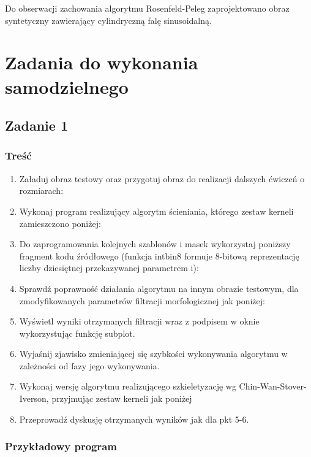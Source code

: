 Do obserwacji zachowania algorytmu Rosenfeld-Peleg zaprojektowano obraz syntetyczny zawierający cylindryczną falę sinusoidalną.

\section{Zadania do wykonania samodzielnego}

\subsection{Zadanie 1}

\subsubsection{Treść}

\begin{enumerate}
	\item Załaduj obraz testowy oraz przygotuj obraz do realizacji dalszych ćwiczeń o rozmiarach:
	\item Wykonaj program realizujący algorytm ścieniania, którego zestaw kerneli zamieszczono poniżej:
	\item Do zaprogramowania kolejnych szablonów i masek wykorzystaj poniższy fragment kodu źródłowego (funkcja intbin8 formuje 8-bitową reprezentację liczby dziesiętnej przekazywanej parametrem i):
	\item Sprawdź poprawność działania algorytmu na innym obrazie testowym, dla zmodyfikowanych
	parametrów filtracji morfologicznej jak poniżej:
	\item Wyświetl wyniki otrzymanych filtracji wraz z podpisem w oknie wykorzystując funkcję subplot.
	\item Wyjaśnij zjawisko zmieniającej się szybkości wykonywania algorytmu w zależności od fazy jego wykonywania.
	\item Wykonaj wersję algorytmu realizującego szkieletyzację wg Chin-Wan-Stover-Iverson, przyjmując zestaw kerneli jak poniżej
	\item Przeprowadź dyskusję otrzymanych wyników jak dla pkt 5-6.
\end{enumerate}

\subsubsection{Przykładowy program}



